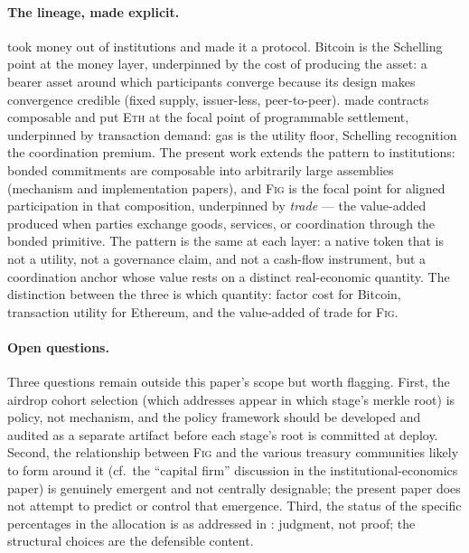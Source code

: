 \documentclass[11pt,a4paper]{article}
\theoremstyle{definition}
\theoremstyle{remark}
\newcommand{\fig}{\textsc{Fig}}
\begin{document}
\paragraph{The lineage, made explicit.}
\citet{nakamoto2008bitcoin} took money out of institutions and
made it a protocol. Bitcoin is the Schelling point at the money
layer, underpinned by the cost of producing the asset: a bearer
asset around which participants converge because its design
makes convergence credible (fixed supply, issuer-less,
peer-to-peer). \citet{buterin2014ethereum} made contracts
composable and put \textsc{Eth} at the focal point of
programmable settlement, underpinned by transaction demand: gas
is the utility floor, Schelling recognition the coordination
premium. The present work extends the pattern to institutions:
bonded commitments are composable into arbitrarily large
assemblies (mechanism and implementation papers), and
\fig{} is the focal point for aligned participation in that
composition, underpinned by \emph{trade} --- the value-added
produced when parties exchange goods, services, or coordination
through the bonded primitive. The pattern is the same at each
layer: a native token that is not a utility, not a governance
claim, and not a cash-flow instrument, but a coordination anchor
whose value rests on a distinct real-economic quantity. The
distinction between the three is which quantity: factor cost for
Bitcoin, transaction utility for Ethereum, and the value-added
of trade for \fig{}.

\paragraph{Open questions.}
Three questions remain outside this paper's scope but worth
flagging. First, the airdrop cohort selection (which addresses
appear in which stage's merkle root) is policy, not mechanism,
and the policy framework should be developed and audited as a
separate artifact before each stage's root is committed at
deploy. Second, the relationship between \fig{} and the various
treasury communities likely to form around it (cf.\ the
``capital firm'' discussion in the institutional-economics paper) is
genuinely emergent and not centrally designable; the present
paper does not attempt to predict or control that emergence.
Third, the status of the specific percentages in the allocation
is as addressed in : judgment, not proof;
the structural choices are the defensible content.
\end{document}
